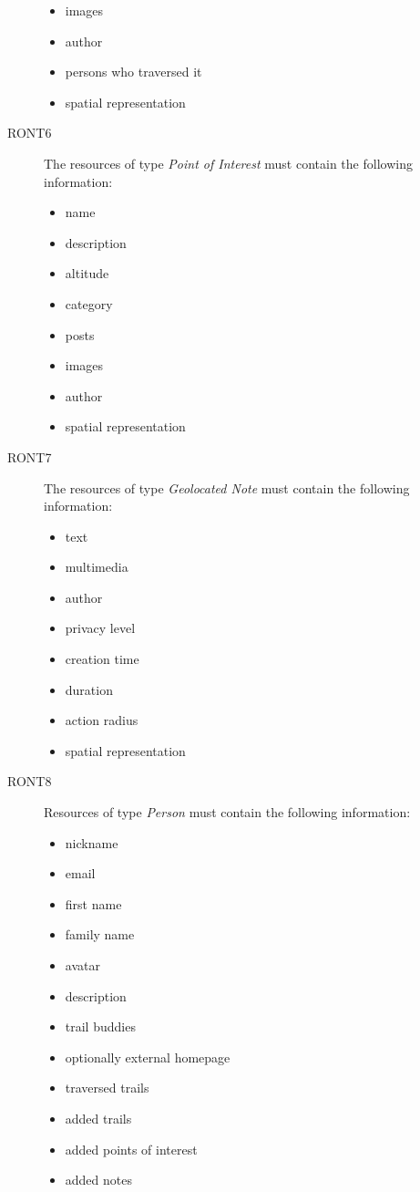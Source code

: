\begin{description}
\begin{itemize}
\item images
\item author
\item persons who traversed it
\item spatial representation
\end{itemize}
\item[RONT6] The resources of type \textit{Point of Interest} must contain the following information:
\begin{itemize}
\item name
\item description
\item altitude
\item category
\item posts
\item images
\item author
\item spatial representation
\end{itemize}
\item[RONT7] The resources of type \textit{Geolocated Note} must contain the following information:
\begin{itemize}
\item text
\item multimedia
\item author
\item privacy level
\item creation time
\item duration
\item action radius
\item spatial representation
\end{itemize}
\item[RONT8] Resources of type \textit{Person} must contain the following information:
\begin{itemize}
\item nickname
\item email
\item first name
\item family name
\item avatar
\item description
\item trail buddies
\item optionally external homepage
\item traversed trails
\item added trails
\item added points of interest
\item added notes

\end{itemize}
\end{description}
